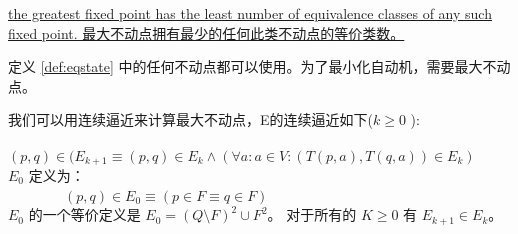 
\begin{remark}
    \uline{the greatest fixed point has the least number of equivalence classes of any such fixed point. 最大不动点拥有最少的任何此类不动点的等价类数。}
\end{remark}


\begin{remark}
    定义 \ref{def:eqstate} 中的任何不动点都可以使用。为了最小化自动机，需要最大不动点。
\end{remark}


\begin{property}[近似$E$]
    我们可以用连续逼近来计算最大不动点，E的连续逼近如下($ k \ge 0 $ ):\\
　　　　$(p,q) \in (E_{k+1} \equiv (p,q) \in E_k \land (\forall a:a \in V : (T(p,a),T(q,a))\in E_k ) $ \\
$E_0$ 定义为：\\
　　　　$(p,q) \in E_0 \equiv (p \in F \equiv q \in F)  $ \\
$E_0$ 的一个等价定义是 $E_0 = (Q \setminus F)^2 \cup F^2$。 对于所有的 $K \ge 0$ 有 $E_{k+1} \in E_k$。
\end{property}


